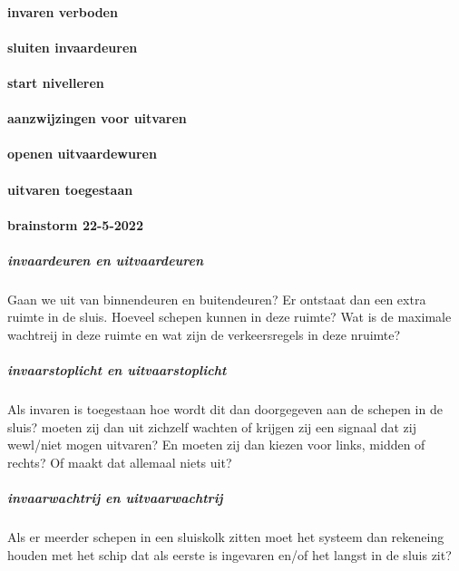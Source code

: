 \paragraph{invaren verboden}

\paragraph{sluiten invaardeuren}

\paragraph{start nivelleren}

\paragraph{aanzwijzingen voor uitvaren}
\paragraph{openen uitvaardewuren}

\paragraph{uitvaren toegestaan}




\paragraph{brainstorm 22-5-2022}

\subparagraph{invaardeuren en uitvaardeuren}
Gaan we uit van binnendeuren en buitendeuren? Er ontstaat dan een extra ruimte in de sluis. Hoeveel schepen kunnen in deze ruimte? Wat is de maximale wachtreij in deze ruimte en wat zijn de verkeersregels in deze nruimte?
\subparagraph{invaarstoplicht en uitvaarstoplicht}
Als invaren is toegestaan hoe wordt dit dan doorgegeven aan de schepen in de sluis? moeten zij dan uit zichzelf wachten of krijgen zij een signaal dat zij wewl/niet mogen uitvaren? En moeten zij dan kiezen voor links, midden of rechts? Of maakt dat allemaal niets uit?

\subparagraph{invaarwachtrij en uitvaarwachtrij}
Als er meerder schepen in een sluiskolk zitten moet het systeem dan rekeneing houden met het schip dat als eerste is ingevaren en/of het langst in de sluis zit?




